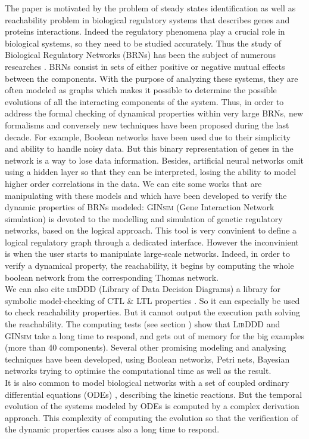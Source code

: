 The paper is motivated by the problem of steady states identification as well as reachability problem in biological regulatory systems that describes genes and proteins interactions. Indeed the regulatory phenomena play a crucial role in biological systems, so they need to be studied accurately. Thus the study of Biological Regulatory Networks (BRNs) has been the subject of numerous researches \cite{thieffry1999modularity, shermin20092, rauf2011formal}. BRNs consist in sets of either positive or negative mutual effects between the components. With the purpose of analyzing these systems, they are often modeled as graphs which makes it possible to determine the possible evolutions of all the interacting components of the system. Thus, in order to address the formal checking of dynamical properties within very large BRNs, new formalisms and conversely new techniques have been proposed during the last decade. For example, Boolean networks \cite{stuart1993origins, kauffman1969metabolic} have been used due to their simplicity and ability to handle noisy data. But this binary representation of genes in the network is a way to lose data information. Besides, artificial neural networks omit using a hidden layer so that they can be interpreted, losing the ability to model higher order correlations in the data. We can cite some works that are manipulating with these models and which have been developed to verify the dynamic properties of BRNs modeled: \textsc{GINsim} (Gene Interaction Network simulation) \cite{chaouiya2012logical, gonzalez2006ginsim} is devoted to the modelling and simulation of genetic regulatory networks, based on the logical approach. This tool is very convinient  to define a logical regulatory graph through a dedicated interface. However the inconvinient is when the user starts to manipulate large-scale networks. Indeed, in order to verify a dynamical property, the reachability, it begins by computing the whole boolean network from the corresponding Thomas network. \\ 
We can also cite \textsc{libDDD} (Library of Data Decision Diagrams) a library for symbolic model-checking of CTL \& LTL properties \cite{libddd, Kordon09libddd}. So it can especially be used to check reachability properties. But it cannot output the execution path solving the reachability. The computing tests (see section ) show that \textsc{LibDDD} and \textsc{GINsim} take a long time to respond, and gets out of memory for the big examples (more than 40 components).  %
Several other promising modeling and analysing techniques have been developed, using Boolean networks, Petri nets, Bayesian networks \cite{numata2008partial} trying to optimise the computational time as well as the result.\\ %
It is also common to model biological networks with a set of coupled ordinary differential equations (ODEs) \cite{chu2009models}, describing the kinetic reactions. But the temporal evolution of the systems modeled by ODEs is computed by a complex derivation approach. This complexity of computing the evolution so that the verification of the dynamic properties causes also a long time to respond. 

